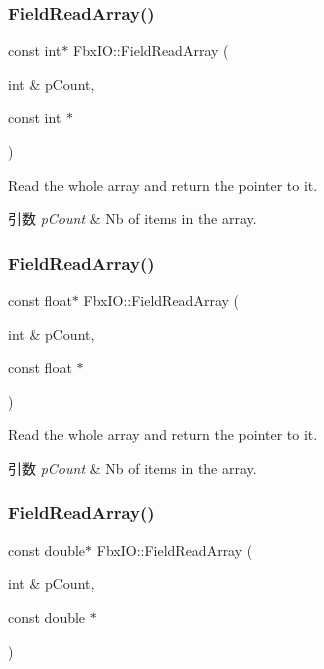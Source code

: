 \subsubsection{\texorpdfstring{Field\+Read\+Array()}{FieldReadArray()}\hspace{0.1cm}{\footnotesize\ttfamily [6/11]}}
{\footnotesize\ttfamily const int$\ast$ Fbx\+I\+O\+::\+Field\+Read\+Array (\begin{DoxyParamCaption}\item[{int \&}]{p\+Count,  }\item[{const int $\ast$}]{ }\end{DoxyParamCaption})}

Read the whole array and return the pointer to it. 
\begin{DoxyParams}{引数}
{\em p\+Count} & Nb of items in the array. \\
\hline
\end{DoxyParams}
\mbox{\label{class_fbx_i_o_abcff764be3af4fa295a81f45148258a5}} 
\subsubsection{\texorpdfstring{Field\+Read\+Array()}{FieldReadArray()}\hspace{0.1cm}{\footnotesize\ttfamily [7/11]}}
{\footnotesize\ttfamily const float$\ast$ Fbx\+I\+O\+::\+Field\+Read\+Array (\begin{DoxyParamCaption}\item[{int \&}]{p\+Count,  }\item[{const float $\ast$}]{ }\end{DoxyParamCaption})}

Read the whole array and return the pointer to it. 
\begin{DoxyParams}{引数}
{\em p\+Count} & Nb of items in the array. \\
\hline
\end{DoxyParams}
\mbox{\label{class_fbx_i_o_a028d17076626570f69daaea0ebb7b70f}} 
\subsubsection{\texorpdfstring{Field\+Read\+Array()}{FieldReadArray()}\hspace{0.1cm}{\footnotesize\ttfamily [8/11]}}
{\footnotesize\ttfamily const double$\ast$ Fbx\+I\+O\+::\+Field\+Read\+Array (\begin{DoxyParamCaption}\item[{int \&}]{p\+Count,  }\item[{const double $\ast$}]{ }\end{DoxyParamCaption})}

